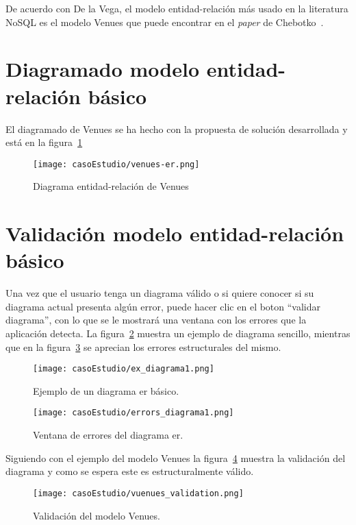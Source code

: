 
De acuerdo con De la Vega\cite{de_la_vega_mortadelo_2020}, el modelo entidad-relación más usado en la literatura NoSQL es el modelo Venues que puede encontrar en el \textit{paper} de Chebotko~\cite{chebotko_big_2015}.

\section{Diagramado modelo entidad-relación básico}

El diagramado de Venues se ha hecho con la propuesta de solución desarrollada y está en la figura~\ref{img:venues-er}

\begin{figure}[H]
    \centering
    \texttt{[image: casoEstudio/venues-er.png]}
    \caption{Diagrama entidad-relación de Venues}
    \label{img:venues-er}
\end{figure}

\section{Validación modelo entidad-relación básico}

 Una vez que el usuario tenga un diagrama válido o si quiere conocer si su diagrama actual presenta algún error, puede hacer clic en el boton ``validar diagrama'', con lo que se le mostrará una ventana con los errores que la aplicación detecta. La figura~\ref{img:ex_diagrama1} muestra un ejemplo de diagrama sencillo, mientras que en la figura~\ref{img:errors_diagrama1} se aprecian los errores estructurales del mismo.

 \begin{figure}[H]
  \centering
  \texttt{[image: casoEstudio/ex\_diagrama1.png]}
  \caption{Ejemplo de un diagrama er básico.}
  \label{img:ex_diagrama1}
\end{figure}

\begin{figure}[H]
  \centering
  \texttt{[image: casoEstudio/errors\_diagrama1.png]}
  \caption{Ventana de errores del diagrama er.}
  \label{img:errors_diagrama1}
\end{figure}

 Siguiendo con el ejemplo del modelo Venues la figura~\ref{img:venues_validationER} muestra la validación del diagrama y como se espera este es estructuralmente válido.

 \begin{figure}[H]
  \centering
  \texttt{[image: casoEstudio/vuenues\_validation.png]}
  \caption{Validación del modelo Venues.}
  \label{img:venues_validationER}
\end{figure}

